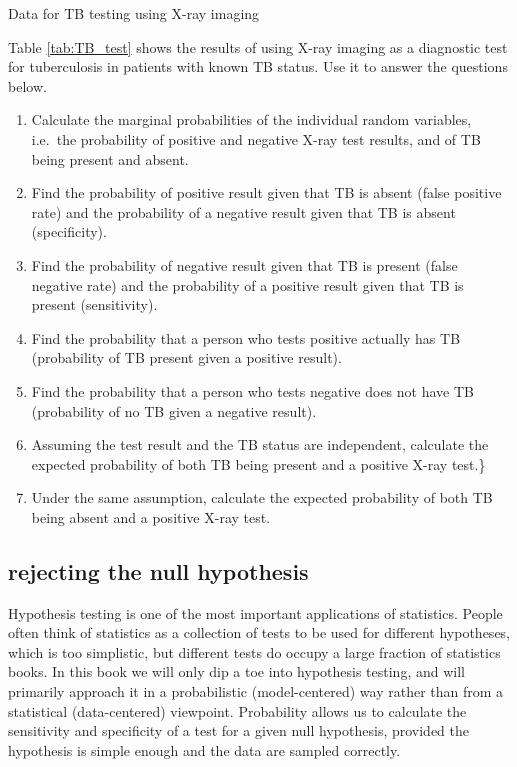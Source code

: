 \documentclass[
  letterpaper,
  DIV=11,
  numbers=noendperiod]{scrreprt}
\begin{document}
Data for TB testing using X-ray imaging

Table \ref{tab:TB_test} shows the results of using X-ray imaging as a
diagnostic test for tuberculosis in patients with known TB status. Use
it to answer the questions below.

\begin{enumerate}
\def\labelenumi{\arabic{enumi}.}
\item
  Calculate the marginal probabilities of the individual random
  variables, i.e.~the probability of positive and negative X-ray test
  results, and of TB being present and absent.
\item
  Find the probability of positive result given that TB is absent (false
  positive rate) and the probability of a negative result given that TB
  is absent (specificity).
\item
  Find the probability of negative result given that TB is present
  (false negative rate) and the probability of a positive result given
  that TB is present (sensitivity).
\item
  Find the probability that a person who tests positive actually has TB
  (probability of TB present given a positive result).
\item
  Find the probability that a person who tests negative does not have TB
  (probability of no TB given a negative result).
\item
  Assuming the test result and the TB status are independent, calculate
  the expected probability of both TB being present and a positive X-ray
  test.\}
\item
  Under the same assumption, calculate the expected probability of both
  TB being absent and a positive X-ray test.
\end{enumerate}

\hypertarget{rejecting-the-null-hypothesis}{%
\subsection{rejecting the null
hypothesis}\label{rejecting-the-null-hypothesis}}

Hypothesis testing is one of the most important applications of
statistics. People often think of statistics as a collection of tests to
be used for different hypotheses, which is too simplistic, but different
tests do occupy a large fraction of statistics books. In this book we
will only dip a toe into hypothesis testing, and will primarily approach
it in a probabilistic (model-centered) way rather than from a
statistical (data-centered) viewpoint. Probability allows us to
calculate the sensitivity and specificity of a test for a given null
hypothesis, provided the hypothesis is simple enough and the data are
sampled correctly.
\end{document}
